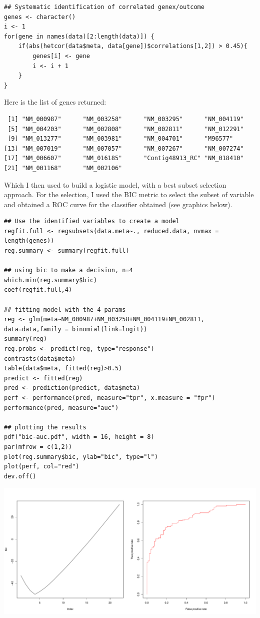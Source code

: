 \documentclass[11pt, a4paper]{article}
\begin{document}
\begin{verbatim}
## Systematic identification of correlated genex/outcome
genes <- character()
i <- 1
for(gene in names(data)[2:length(data)]) {
    if(abs(hetcor(data$meta, data[gene])$correlations[1,2]) > 0.45){
        genes[i] <- gene
        i <- i + 1
    }
}
\end{verbatim}

Here is the list of genes returned:


\begin{verbatim}
 [1] "NM_000987"      "NM_003258"      "NM_003295"      "NM_004119"     
 [5] "NM_004203"      "NM_002808"      "NM_002811"      "NM_012291"     
 [9] "NM_013277"      "NM_003981"      "NM_004701"      "M96577"        
[13] "NM_007019"      "NM_007057"      "NM_007267"      "NM_007274"     
[17] "NM_006607"      "NM_016185"      "Contig48913_RC" "NM_018410"     
[21] "NM_001168"      "NM_002106"
\end{verbatim}

Which I then used to build a logistic model, with a best subset
selection approach. For the selection, I used the BIC metric to
select the subset of variable and obtained a ROC curve for the
classifier obtained (see graphics below).


\begin{verbatim}
## Use the identified variables to create a model
regfit.full <- regsubsets(data.meta~., reduced.data, nvmax = length(genes))
reg.summary <- summary(regfit.full)

## using bic to make a decision, n=4
which.min(reg.summary$bic)
coef(regfit.full,4)

## fitting model with the 4 params
reg <- glm(meta~NM_000987+NM_003258+NM_004119+NM_002811, data=data,family = binomial(link=logit))
summary(reg)
reg.probs <- predict(reg, type="response")
contrasts(data$meta)
table(data$meta, fitted(reg)>0.5)
predict <- fitted(reg)
pred <- prediction(predict, data$meta)
perf <- performance(pred, measure="tpr", x.measure = "fpr")
performance(pred, measure="auc")

## plotting the results
pdf("bic-auc.pdf", width = 16, height = 8)
par(mfrow = c(1,2))
plot(reg.summary$bic, ylab="bic", type="l")
plot(perf, col="red")
dev.off()
\end{verbatim}

\includegraphics[scale=0.4]{bic-auc.pdf}
\end{document}
